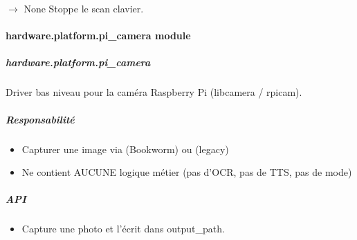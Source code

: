 \documentclass[letterpaper,10pt,french]{sphinxmanual}
\begin{document}
\begin{fulllineitems}

\begin{fulllineitems}
\label{\detokenize{api/hardware.platform:hardware.platform.keypad_4x4.Keypad4x4.stop}}
\pysigstartsignatures
\pysiglinewithargsret
{}
{}
{{ $\rightarrow$ None}}
\pysigstopsignatures
\sphinxAtStartPar
Stoppe le scan clavier.

\end{fulllineitems}


\end{fulllineitems}



\paragraph{hardware.platform.pi\_camera module}
\label{\detokenize{api/hardware.platform:module-hardware.platform.pi_camera}}\label{\detokenize{api/hardware.platform:hardware-platform-pi-camera-module}}

\subparagraph{hardware.platform.pi\_camera}
\label{\detokenize{api/hardware.platform:hardware-platform-pi-camera}}
\sphinxAtStartPar
Driver bas niveau pour la caméra Raspberry Pi (libcamera / rpicam).


\subparagraph{Responsabilité}
\label{\detokenize{api/hardware.platform:id1}}\begin{itemize}
\item {} 
\sphinxAtStartPar
Capturer une image via  (Bookworm) ou  (legacy)

\item {} 
\sphinxAtStartPar
Ne contient AUCUNE logique métier (pas d’OCR, pas de TTS, pas de mode)

\end{itemize}


\subparagraph{API}
\label{\detokenize{api/hardware.platform:api}}\begin{itemize}
\item {} \begin{description}
\sphinxAtStartPar
Capture une photo et l’écrit dans output\_path.

\end{description}

\end{itemize}
\end{document}
